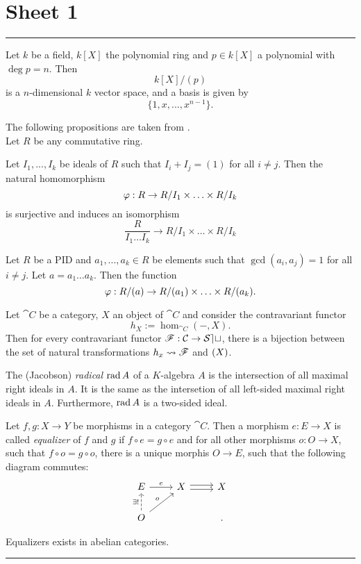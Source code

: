 \section{Sheet 1}

\hrule
\begin{prop}
Let $k$ be a field, $k[X]$ the polynomial ring and $p\in k[X]$ a polynomial with $\deg p=n$. Then
	\[
	k[X]/(p)
	\]
is a $n$-dimensional $k$ vector space, and a basis is given by
	\[
	\{1,x,...,x^{n-1}\}.
	\]
\end{prop}
The following propositions are taken from \cite{aluffi}.\\
Let $R$ be any commutative ring.
\begin{prop}
  Let $I_1,...,I_k$ be ideals of $R$ such that $I_i+I_j=(1)$ for all $i\neq j$. Then the natural homomorphism
  \[
  \varphi :R\to R/I_1\times \hdots \times R/I_k
  \]
  is surjective and induces an isomorphism
  \[
  \frac{R}{I_1\hdots I_k}\to R/I_1\times \hdots \times R/I_k
  \]
\end{prop}
\begin{cor}
  Let $R$ be a PID and $a_1,...,a_k\in R$ be elements such that $\gcd(a_i,a_j)=1$ for all $i\neq j$. Let $a=a_1\hdots a_k$. Then the function
  \[
  \varphi: R/(a)\to R/(a_1)\times \hdots \times R/(a_k).
  \]
\end{cor}
\begin{prop}
	Let $\cat{C}$ be a category, $X$ an object of $\cat{C}$ and consider the contravariant functor
	\[
	h_X:= \hom_{\cat{C}}(-,X).
	\]
	Then for every contravariant functor $\mathscr{F}:\mathcal{C}\to \mathcal{Set}$, there is a bijection between the set of natural transformations $h_x\leadsto\mathscr{F}$ and $\mathscr{(}X)$.
\end{prop}
\begin{defn}
	The (Jacobson) \emph{radical} $\operatorname{rad} A$ of a $K$-algebra $A$ is the intersection of all maximal right ideals in $A$. It is the same as the intersetion of all left-sided maximal right ideals in $A$. Furthermore, $\operatorname{rad} A$ is a two-sided ideal.
\end{defn}

\begin{defn}
	Let $f,g:X\to Y$ be morphisms in a category $\cat{C}$. Then a morphism $e:E\to X$ is called \emph{equalizer} of $f$ and $g$ if $f\circ e=g\circ e$ and for all other morphisms $o:O\to X$, such that $f\circ o=g\circ o$, there is a unique morphis $O\to E$, such that the following diagram commutes:
	\[
	\begin{tikzcd}
		E\ar{r}{e}&X\ar[shift left = .5ex]{r}\ar[shift right = .5ex]{r}&X\\
		O\ar[dashed]{u}{\exists !}\ar{ur}{o}&&.
	\end{tikzcd}
	\]
\end{defn}
\begin{prop}
	Equalizers exists in abelian categories.
\end{prop}
\hrule
